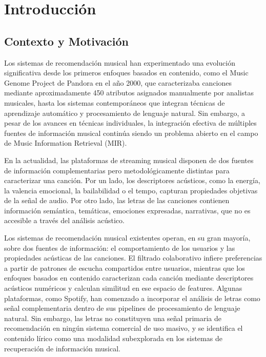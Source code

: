 \chapter{Introducción}
\label{ch:introduccion}

\section{Contexto y Motivación}
\label{sec:contexto-motivacion}

Los sistemas de recomendación musical han experimentado una evolución significativa desde los primeros enfoques basados en contenido, como el Music Genome Project de Pandora en el año 2000, que caracterizaba canciones mediante aproximadamente 450 atributos asignados manualmente por analistas musicales, hasta los sistemas contemporáneos que integran técnicas de aprendizaje automático y procesamiento de lenguaje natural. Sin embargo, a pesar de los avances en técnicas individuales, la integración efectiva de múltiples fuentes de información musical continúa siendo un problema abierto en el campo de Music Information Retrieval (MIR).

En la actualidad, las plataformas de streaming musical disponen de dos fuentes de información complementarias pero metodológicamente distintas para caracterizar una canción. Por un lado, los descriptores acústicos, como la energía, la valencia emocional, la bailabilidad o el tempo, capturan propiedades objetivas de la señal de audio. Por otro lado, las letras de las canciones contienen información semántica, temáticas, emociones expresadas, narrativas, que no es accesible a través del análisis acústico.

Los sistemas de recomendación musical existentes operan, en su gran mayoría, sobre dos fuentes de información: el comportamiento de los usuarios y las propiedades acústicas de las canciones. El filtrado colaborativo infiere preferencias a partir de patrones de escucha compartidos entre usuarios, mientras que los enfoques basados en contenido caracterizan cada canción mediante descriptores acústicos numéricos y calculan similitud en ese espacio de features. Algunas plataformas, como Spotify, han comenzado a incorporar el análisis de letras como señal complementaria dentro de sus pipelines de procesamiento de lenguaje natural. Sin embargo, las letras no constituyen una señal primaria de recomendación en ningún sistema comercial de uso masivo, y se identifica el contenido lírico como una modalidad subexplorada en los sistemas de recuperación de información musical.

